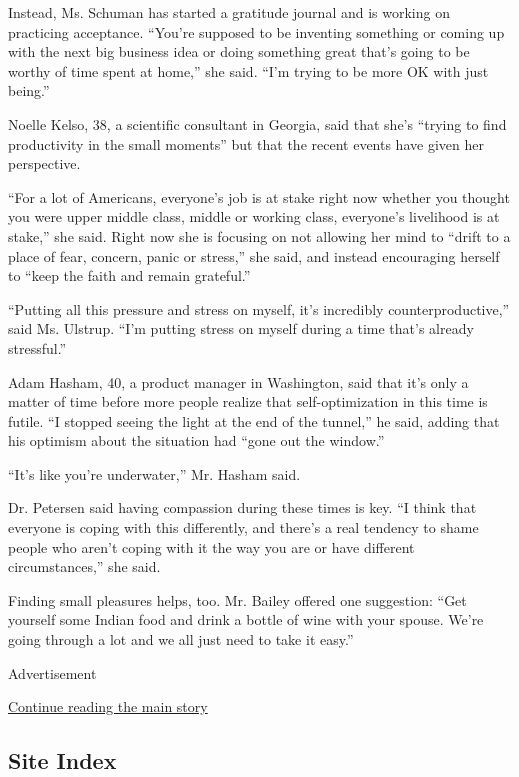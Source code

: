 Instead, Ms. Schuman has started a gratitude journal and is working on
practicing acceptance. ``You're supposed to be inventing something or
coming up with the next big business idea or doing something great
that's going to be worthy of time spent at home,'' she said. ``I'm
trying to be more OK with just being.''

Noelle Kelso, 38, a scientific consultant in Georgia, said that she's
``trying to find productivity in the small moments'' but that the recent
events have given her perspective.

``For a lot of Americans, everyone's job is at stake right now whether
you thought you were upper middle class, middle or working class,
everyone's livelihood is at stake,'' she said. Right now she is focusing
on not allowing her mind to ``drift to a place of fear, concern, panic
or stress,'' she said, and instead encouraging herself to ``keep the
faith and remain grateful.''

``Putting all this pressure and stress on myself, it's incredibly
counterproductive,'' said Ms. Ulstrup. ``I'm putting stress on myself
during a time that's already stressful.''

Adam Hasham, 40, a product manager in Washington, said that it's only a
matter of time before more people realize that self-optimization in this
time is futile. ``I stopped seeing the light at the end of the tunnel,''
he said, adding that his optimism about the situation had ``gone out the
window.''

``It's like you're underwater,'' Mr. Hasham said.

Dr. Petersen said having compassion during these times is key. ``I think
that everyone is coping with this differently, and there's a real
tendency to shame people who aren't coping with it the way you are or
have different circumstances,'' she said.

Finding small pleasures helps, too. Mr. Bailey offered one suggestion:
``Get yourself some Indian food and drink a bottle of wine with your
spouse. We're going through a lot and we all just need to take it
easy.''

Advertisement

\protect\hyperlink{after-bottom}{Continue reading the main story}

\hypertarget{site-index}{%
\subsection{Site Index}\label{site-index}}

